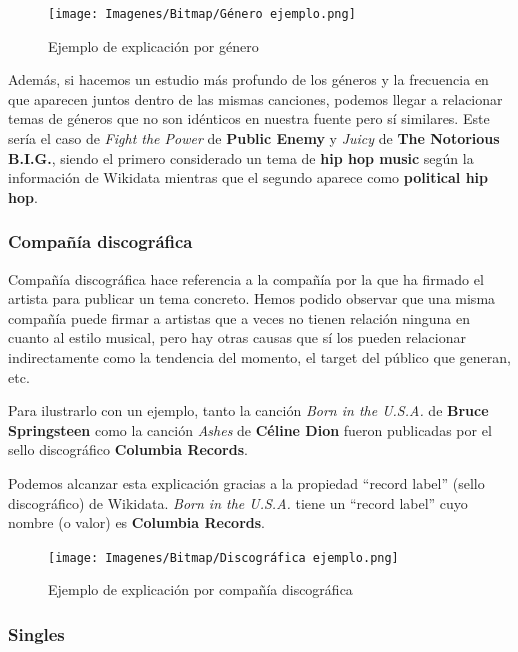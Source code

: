 \begin{figure}[h!]
	\centering
	\texttt{[image: Imagenes/Bitmap/Género ejemplo.png]}
	\caption{Ejemplo de explicación por género}
	\label{fig:sampleImage}
\end{figure}

Además, si hacemos un estudio más profundo de los géneros y la frecuencia en que aparecen juntos dentro de las mismas canciones, podemos llegar a relacionar temas de géneros que no son idénticos en nuestra fuente pero sí similares. Este sería el caso de \textit{Fight the Power} de \textbf{Public Enemy} y \textit{Juicy} de \textbf{The Notorious B.I.G.}, siendo el primero considerado un tema de \textbf{hip hop music} según la información de Wikidata mientras que el segundo aparece como \textbf{political hip hop}.

\subsubsection*{Compañía discográfica}

Compañía discográfica hace referencia a la compañía por la que ha firmado el artista para publicar un tema concreto. Hemos podido observar que una misma compañía puede firmar a artistas que a veces no tienen relación ninguna en cuanto al estilo musical, pero hay otras causas que sí los pueden relacionar indirectamente como la tendencia del momento, el target del público que generan, etc.

Para ilustrarlo con un ejemplo, tanto la canción \textit{Born in the U.S.A.} de \textbf{Bruce Springsteen} como la canción \textit{Ashes} de \textbf{Céline Dion} fueron publicadas por el sello discográfico \textbf{Columbia Records}.

Podemos alcanzar esta explicación gracias a la propiedad ``record label'' (sello discográfico) de Wikidata. \textit{Born in the U.S.A.} tiene un ``record label'' cuyo nombre (o valor) es \textbf{Columbia Records}.\\

\begin{figure}[h!]
	\centering
	\texttt{[image: Imagenes/Bitmap/Discográfica ejemplo.png]}
	\caption{Ejemplo de explicación por compañía discográfica}
	\label{fig:sampleImage}
\end{figure}

\subsubsection*{Singles}

